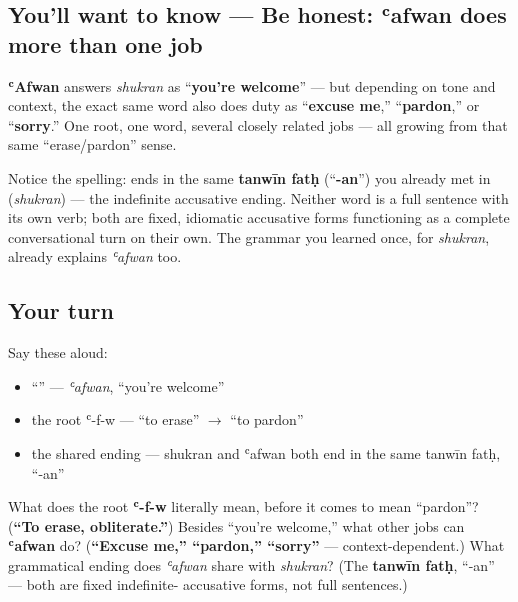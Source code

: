 \subsection*{You'll want to know — Be honest: ʿafwan does more than one job}
\textbf{ʿAfwan} answers \emph{shukran} as \textquotedblleft{}\textbf{you're welcome}\textquotedblright{} — but depending on tone and context, the exact same word also does duty as \textquotedblleft{}\textbf{excuse me},\textquotedblright{} \textquotedblleft{}\textbf{pardon},\textquotedblright{} or \textquotedblleft{}\textbf{sorry}.\textquotedblright{} One root, one word, several closely related jobs — all growing from that same \textquotedblleft{}erase/pardon\textquotedblright{} sense.

\begin{grammarlens}[title={Grammar Lens: the same ending as shukran itself}]
Notice the spelling: \textbf{} ends in the same \textbf{tanwīn fatḥ} (\textquotedblleft{}\textbf{-an}\textquotedblright{}) you already met in \textbf{} (\emph{shukran}) — the indefinite accusative ending. Neither word is a full sentence with its own verb; both are fixed, idiomatic accusative forms functioning as a complete conversational turn on their own. The grammar you learned once, for \emph{shukran}, already explains \emph{ʿafwan} too.
\end{grammarlens}

\subsection*{Your turn}
Say these aloud:

\begin{itemize}
\raggedright
  \item \textquotedblleft{}\textquotedblright{} — \emph{ʿafwan}, \textquotedblleft{}you're welcome\textquotedblright{}
  \item the root ʿ-f-w — \textquotedblleft{}to erase\textquotedblright{} $\to$ \textquotedblleft{}to pardon\textquotedblright{}
  \item the shared ending — shukran and ʿafwan both end in the same tanwīn fatḥ, \textquotedblleft{}-an\textquotedblright{}
\end{itemize}

\begin{tcolorbox}[breakable,colback=teal!4,colframe=teal!35!black,title={Before you move on}]
What does the root \textbf{ʿ-f-w} literally mean, before it comes to mean \textquotedblleft{}pardon\textquotedblright{}? (\textbf{\textquotedblleft{}To erase, obliterate.\textquotedblright{}}) Besides \textquotedblleft{}you're welcome,\textquotedblright{} what other jobs can \textbf{ʿafwan} do? (\textbf{\textquotedblleft{}Excuse me,\textquotedblright{} \textquotedblleft{}pardon,\textquotedblright{} \textquotedblleft{}sorry\textquotedblright{}} — context-dependent.) What grammatical ending does \emph{ʿafwan} share with \emph{shukran}? (The \textbf{tanwīn fatḥ}, \textquotedblleft{}-an\textquotedblright{} — both are fixed indefinite- accusative forms, not full sentences.)
\end{tcolorbox}
